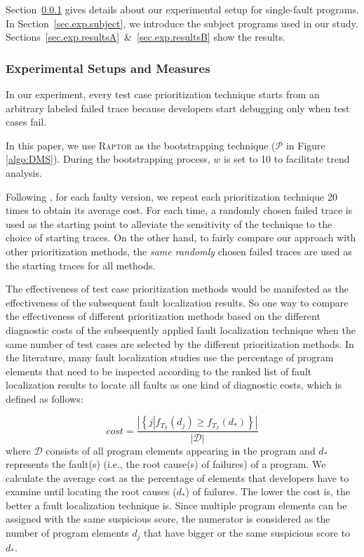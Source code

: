 Section~\ref{sec.exp.setup} gives details about our experimental setup for single-fault programs.
In Section~\ref{sec.exp.subject}, we introduce the subject programs used in our study. Sections~\ref{sec.exp.resultsA}~\&~\ref{sec.exp.resultsB} show the results.

\subsubsection{Experimental Setups and Measures}\label{sec.exp.setup}

In our experiment, every test case prioritization technique starts from
an arbitrary labeled failed trace because developers start debugging only when
test cases fail.

In this paper, we use \textsc{Raptor} as the bootstrapping technique ($\mathcal{P}$ in Figure \ref{algo:DMS}). During the bootstrapping process, $w$ is set to 10 to facilitate trend analysis. 

Following \cite{JiangCT11}, for each faulty version, we repeat each prioritization technique 20 times to obtain its average cost. For each time, a randomly chosen failed trace is used as the starting point to alleviate the sensitivity of the technique to the choice of starting traces. On the other hand, to fairly compare our approach with other prioritization methods, the {\em same randomly} chosen failed traces are used as the starting traces for all methods.

The effectiveness of test case prioritization methods would be manifested as the effectiveness of the subsequent fault localization results. 
So one way to compare the effectiveness of different prioritization methods based on the different diagnostic costs of the subsequently applied fault localization technique when the same number of test cases are selected by the different prioritization methods. In the literature, many fault localization studies use the percentage of program elements that need to be inspected according to the ranked list of fault localization results to locate all faults as one kind of diagnostic costs,
which is defined as follows:

\begin{equation}\label{equation.avgcost}
	cost = \dfrac{\left|  \left\{ j \left| \right. f_{T_{\mathcal{S}}}(d_j) \geq f_{T_{\mathcal{S}}}(d_*) \right\}  \right|}{\left|  \mathcal{D} \right|}
\end{equation}
where $\mathcal{D}$ consists of all program elements appearing in the program and $d_*$ represents the fault(s) (i.e., the root cause(s) of failures) of a program.
We calculate the average cost as the percentage of elements that developers have
to examine until locating the root causes ($d_*$) of failures. The lower the cost is, the better a fault localization technique is. 
Since multiple
program elements can be assigned with the same suspicious score, the numerator
is considered as the number of program elements $d_j$ that have bigger or the
same suspicious score to $d_*$. 

